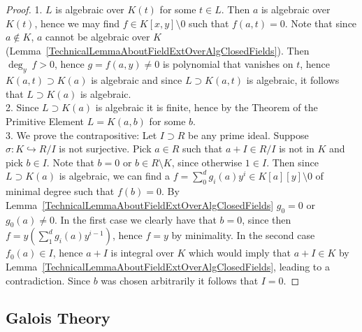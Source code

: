 \begin{proof}
    1. $L$ is algebraic over $K(t)$ for some $t\in L$. Then $a$ is algebraic over $K(t)$, hence we may find $f\in K[x,y]\setminus 0$ such that $f(a,t)=0$. Note that since $a\notin K$, $a$ cannot be algebraic over $K$ (Lemma~\ref{TechnicalLemmaAboutFieldExtOverAlgClosedFields}). Then $\deg_y \ f >0$, hence $g=f(a,y)\neq 0$ is polynomial that vanishes on $t$, hence $K(a,t)\supset K(a)$ is algebraic and since $L\supset K(a,t)$ is algebraic, it follows that $L\supset K(a)$ is algebraic.\\
    2. Since $L\supset K(a)$ is algebraic it is finite, hence by the Theorem of the Primitive Element $L=K(a,b)$ for some $b$.\\
    3. We prove the contrapositive: Let $I\supset R$ be any prime ideal. Suppose $\sigma: K\hookrightarrow R/I$ is not surjective. Pick $a\in R$ such that $a+I\in R/I$ is not in $K$ and pick $b\in I$. Note that $b=0$ or $b\in R\setminus K$, since otherwise $1\in I$. Then since $L\supset K(a)$ is algebraic, we can find a $f=\sum_0^d g_i(a)y^i\in K[a][y]\setminus 0$ of minimal degree such that $f(b)=0$. By Lemma~\ref{TechnicalLemmaAboutFieldExtOverAlgClosedFields} $g_0=0$ or $g_0(a)\neq 0$. In the first case we clearly have that $b=0$, since then $f=y(\sum_1^d g_i(a)y^{i-1})$, hence $f=y$ by minimality. In the second case $f_0(a)\in I$, hence $a+I$ is integral over $K$ which would imply that $a+I\in K$ by Lemma~\ref{TechnicalLemmaAboutFieldExtOverAlgClosedFields}, leading to a contradiction. Since $b$ was chosen arbitrarily it follows that $I=0$.
\end{proof}
\subsection{Galois Theory}
